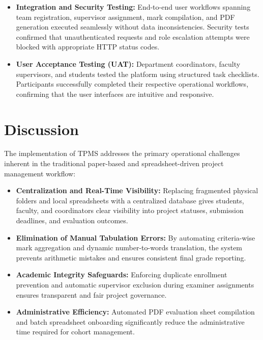 \begin{itemize}
  \item \textbf{Integration and Security Testing:} End-to-end user workflows spanning team registration, supervisor assignment, mark compilation, and PDF generation executed seamlessly without data inconsistencies. Security tests confirmed that unauthenticated requests and role escalation attempts were blocked with appropriate HTTP status codes.
  
  \item \textbf{User Acceptance Testing (UAT):} Department coordinators, faculty supervisors, and students tested the platform using structured task checklists. Participants successfully completed their respective operational workflows, confirming that the user interfaces are intuitive and responsive.
\end{itemize}

\section{Discussion}
The implementation of TPMS addresses the primary operational challenges inherent in the traditional paper-based and spreadsheet-driven project management workflow:

\begin{itemize}
  \item \textbf{Centralization and Real-Time Visibility:} Replacing fragmented physical folders and local spreadsheets with a centralized database gives students, faculty, and coordinators clear visibility into project statuses, submission deadlines, and evaluation outcomes.
  
  \item \textbf{Elimination of Manual Tabulation Errors:} By automating criteria-wise mark aggregation and dynamic number-to-words translation, the system prevents arithmetic mistakes and ensures consistent final grade reporting.
  
  \item \textbf{Academic Integrity Safeguards:} Enforcing duplicate enrollment prevention and automatic supervisor exclusion during examiner assignments ensures transparent and fair project governance.
  
  \item \textbf{Administrative Efficiency:} Automated PDF evaluation sheet compilation and batch spreadsheet onboarding significantly reduce the administrative time required for cohort management.
\end{itemize}

